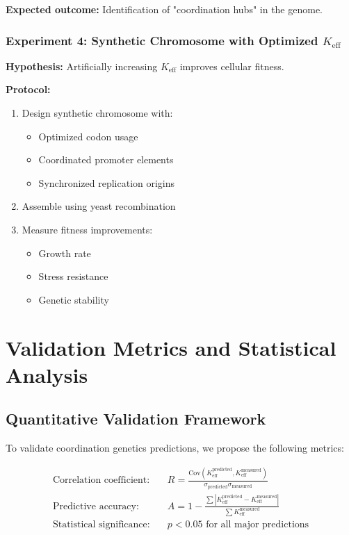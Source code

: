 \documentclass[12pt]{article}
\begin{document}
	\textbf{Expected outcome:} Identification of "coordination hubs" in the genome.
	
	\subsubsection{Experiment 4: Synthetic Chromosome with Optimized $K_{\text{eff}}$}
	\textbf{Hypothesis:} Artificially increasing $K_{\text{eff}}$ improves cellular fitness.
	
	\textbf{Protocol:}
	\begin{enumerate}
		\item Design synthetic chromosome with:
		\begin{itemize}
			\item Optimized codon usage
			\item Coordinated promoter elements
			\item Synchronized replication origins
		\end{itemize}
		\item Assemble using yeast recombination
		\item Measure fitness improvements:
		\begin{itemize}
			\item Growth rate
			\item Stress resistance
			\item Genetic stability
		\end{itemize}
	\end{enumerate}
	
	\section{Validation Metrics and Statistical Analysis}
	
	\subsection{Quantitative Validation Framework}
	
	To validate coordination genetics predictions, we propose the following metrics:
	
	\begin{align*}
		\text{Correlation coefficient:} & \quad R = \frac{\text{Cov}(K_{\text{eff}}^{\text{predicted}}, K_{\text{eff}}^{\text{measured}})}{\sigma_{\text{predicted}} \sigma_{\text{measured}}} \\
		\text{Predictive accuracy:} & \quad A = 1 - \frac{\sum |K_{\text{eff}}^{\text{predicted}} - K_{\text{eff}}^{\text{measured}}|}{\sum K_{\text{eff}}^{\text{measured}}} \\
		\text{Statistical significance:} & \quad p < 0.05 \text{ for all major predictions}
	\end{align*}
	
\end{document}
